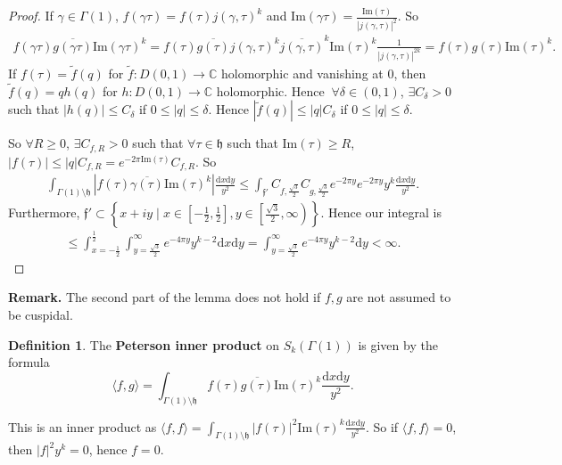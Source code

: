\documentclass{article}
\theoremstyle{definition}
\newtheorem{defn}{Definition}[section]
\begin{document}
\begin{proof}
    If $\gamma \in \Gamma(1)$, $f(\gamma \tau) = f(\tau)j(\gamma,\tau)^{k}$ and $\text{Im}(\gamma \tau) = \frac{\text{Im}(\tau)}{|j(\gamma,\tau)|^2}$. So 
    \begin{align*}
        f(\gamma \tau)\overline{g(\gamma \tau)}\text{Im}(\gamma \tau)^k = f(\tau)\overline{g(\tau)}j(\gamma,\tau)^k \overline{j(\gamma,\tau)}^k \text{Im}(\tau)^k \frac{1}{|j(\gamma,\tau)|^{2k}} = f(\tau)g(\tau)\text{Im}(\tau)^k.
    \end{align*}
    If $f(\tau) = \tilde{f}(q)$ for $\tilde{f}: D(0,1) \to \mathbb{C}$ holomorphic and vanishing at 0, then $\tilde{f}(q) = q h(q)$ for $h: D(0,1) \to \mathbb{C}$ holomorphic. Hence $~\forall \delta \in (0,1)$, $\exists C_{\delta} > 0$ such that $|h(q)| \le C_\delta$ if $0 \le |q| \le \delta$. Hence $|\tilde{f}(q)|\le |q|C_\delta$ if $0\le |q|\le \delta$. 
    \vspace{1mm}
     
    So $\forall R\ge 0$, $\exists C_{f,R} > 0$ such that $\forall \tau \in \mathfrak{h}$ such that $\text{Im}(\tau)\ge R$, $|f(\tau)|\le |q|C_{f,R} = e^{-2\pi \text{Im}(\tau)}C_{f,R}$. So
    \begin{align*}
        \int_{\Gamma(1)\setminus \mathfrak{h}}^{} \left|f(\tau)\overline{\gamma(\tau)}\text{Im}(\tau)^k \right| \frac{\mathrm{d}x\mathrm{d}y}{y^2} \le \int_{\mathfrak{f}'}^{} C_{f,\frac{\sqrt{3}}{2}} C_{g,\frac{\sqrt{3}}{2}} e^{-2\pi y}e^{-2\pi y} y^k \frac{\mathrm{d}x \mathrm{d}y}{y^2}.
    \end{align*}
    Furthermore, $\mathfrak{f}' \subset \left\{x+iy \mid x \in \left[-\frac{1}{2}, \frac{1}{2}\right], y \in \left[\frac{\sqrt{3}}{2},\infty \right)\right\}$. Hence our integral is 
    \begin{align*}
        \le \int_{x=-\frac{1}{2}}^{\frac{1}{2}} \int_{y=\frac{\sqrt{3}}{2}}^{\infty} e^{-4\pi y} y^{k-2} \mathrm{d}x \mathrm{d}y = \int_{y = \frac{\sqrt{3}}{2}}^{\infty} e^{-4\pi y} y^{k-2} \mathrm{d}y < \infty.
    \end{align*}
\end{proof}
\textbf{Remark.} The second part of the lemma does not hold if $f,g$ are not assumed to be cuspidal.

\begin{defn}
    The \textbf{Peterson inner product} on $S_k(\Gamma(1))$ is given by the formula $$\langle f,g \rangle = \int_{\Gamma(1)\setminus \mathfrak{h}}^{} f(\tau)\overline{g(\tau)}\text{Im}(\tau)^k \frac{\mathrm{d}x\mathrm{d}y}{y^2}.$$
\end{defn}
This is an inner product as $\langle f,f \rangle = \int_{\Gamma(1)\setminus \mathfrak{h}}^{} |f(\tau)|^2 \text{Im}(\tau)^{k} \frac{\mathrm{d}x\mathrm{d}y}{y^2}$. So if $\langle f,f \rangle = 0$, then $|f|^2 y^k = 0$, hence $f = 0$.
\end{document}
